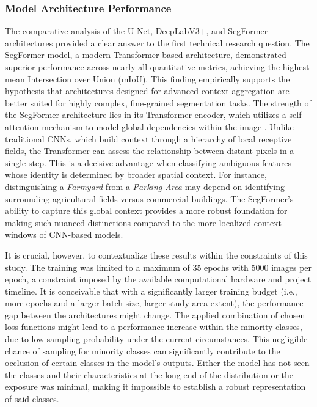 \documentclass{report}
\begin{document}
\subsubsection{Model Architecture Performance}
\label{sec:discussion_model_architecture}
The comparative analysis of the U-Net, DeepLabV3+, and SegFormer architectures provided a clear answer to the first technical research question. The SegFormer model, a modern Transformer-based architecture, demonstrated superior performance across nearly all quantitative metrics, achieving the highest mean Intersection over Union (mIoU). This finding empirically supports the hypothesis that architectures designed for advanced context aggregation are better suited for highly complex, fine-grained segmentation tasks. The strength of the SegFormer architecture lies in its Transformer encoder, which utilizes a self-attention mechanism to model global dependencies within the image \parencite[p.~2, 4.]{XieEtAlSegFormerSimpleEfficientDesignSemanticSegmentationTransformers2021}. Unlike traditional CNNs, which build context through a hierarchy of local receptive fields, the Transformer can assess the relationship between distant pixels in a single step. This is a decisive advantage when classifying ambiguous features whose identity is determined by broader spatial context. For instance, distinguishing a \textit{Farmyard} from a \textit{Parking Area} may depend on identifying surrounding agricultural fields versus commercial buildings. The SegFormer's ability to capture this global context provides a more robust foundation for making such nuanced distinctions compared to the more localized context windows of CNN-based models. \par
It is crucial, however, to contextualize these results within the constraints of this study. The training was limited to a maximum of 35 epochs with 5000 images per epoch, a constraint imposed by the available computational hardware and project timeline. It is conceivable that with a significantly larger training budget (i.e., more epochs and a larger batch size, larger study area extent), the performance gap between the architectures might change. The applied combination of chosen loss functions might lead to a performance increase within the minority classes, due to low sampling probability under the current circumstances. This negligible chance of sampling for minority classes can significantly contribute to the occlusion of certain classes in the model's outputs. Either the model has not seen the classes and their characteristics at the long end of the distribution or the exposure was minimal, making it impossible to establish a robust representation of said classes.
\end{document}
